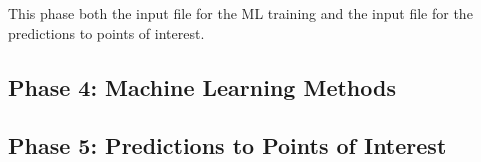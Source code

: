 \documentclass[letterpaper,12pt]{article}
\begin{document}
This phase both the input file for the ML training and the input file for the predictions to points of interest.



\pagebreak
\subsection{Phase 4: Machine Learning Methods} 



\pagebreak
\subsection{Phase 5: Predictions to Points of Interest} 







%


%

\end{document}
